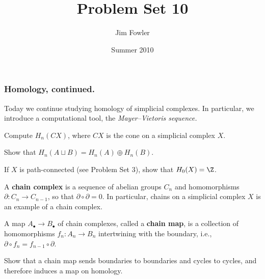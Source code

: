 \documentclass[12pt]{pset}
\title{Problem Set 10}
\author{Jim Fowler}
\date{Summer 2010}
\begin{document}
\maketitle

\subsubsection*{Homology, continued.} Today we continue studying
homology of simplicial complexes.  In particular, we introduce a
computational tool, the \textit{Mayer--Vietoris sequence.}

\baselineskip
\parindent 0pt


\begin{requiredproblem}
  Compute $H_n(CX)$, where $CX$ is the cone on a simplicial complex $X$.
\end{requiredproblem}

\begin{problem}
  Show that $H_n(A \sqcup B) = H_n(A) \oplus H_n(B)$.
\end{problem}

\begin{problem}
  If $X$ is path-connected (see Problem Set 3), show that $H_0(X) = \Z$.
\end{problem}

\begin{definition*}
  A \textbf{chain complex} is a sequence of abelian groups $C_n$ and
  homomorphisms $\partial : C_n \to C_{n-1}$, so that $\partial
  \circ \partial = 0$.  In particular, chains on a simplicial complex
  $X$ is an example of a chain complex.

  A map $A_\bullet \to B_\bullet$ of chain complexes, called a \textbf{chain
    map}, is a collection of homomorphisms $f_n : A_n \to B_n$
  intertwining with the boundary, i.e., $\partial \circ f_n = f_{n-1}
  \circ \partial$.
\end{definition*}

\begin{requiredproblem}
  Show that a chain map sends boundaries to boundaries and cycles to
  cycles, and therefore induces a map on homology.
\end{requiredproblem}
\end{document}
